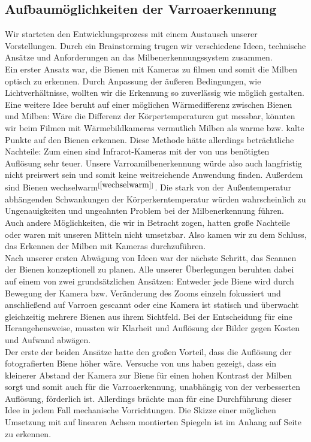 \documentclass[11pt,a4paper]{article}
\newcommand{\bibRef}[1]{\hyperlink{#1}{$^{[\ref*{#1}{}]}$}}
\begin{document}

\subsection{Aufbaumöglichkeiten der Varroaerkennung}
Wir starteten den Entwicklungsprozess mit einem Austausch unserer Vorstellungen. Durch ein Brainstorming trugen wir verschiedene Ideen, technische Ansätze und Anforderungen an das Milbenerkennungssystem zusammen. \\
Ein erster Ansatz war, die Bienen mit Kameras zu filmen und somit die Milben optisch zu erkennen. Durch Anpassung der äußeren Bedingungen, wie Lichtverhältnisse, wollten wir die Erkennung so zuverlässig wie möglich gestalten.\\
Eine weitere Idee beruht auf einer möglichen Wärmedifferenz zwischen Bienen und Milben: Wäre die Differenz der Körpertemperaturen gut messbar, könnten wir beim Filmen mit Wärmebildkameras vermutlich Milben als warme bzw. kalte Punkte auf den Bienen erkennen. Diese Methode hätte allerdings beträchtliche Nachteile: Zum einen sind Infrarot-Kameras mit der von uns benötigten Auflösung sehr teuer. Unsere Varroamilbenerkennung würde also auch langfristig nicht preiswert sein und somit keine weitreichende Anwendung finden. Außerdem sind Bienen wechselwarm\bibRef{wechselwarm}. Die stark von der Außentemperatur abhängenden Schwankungen der Körperkerntemperatur würden wahrscheinlich zu Ungenauigkeiten und ungeahnten Problem bei der Milbenerkennung führen.\\
Auch andere Möglichkeiten, die wir in Betracht zogen, hatten große Nachteile oder waren mit unseren Mitteln nicht umsetzbar. Also kamen wir zu dem Schluss, das Erkennen der Milben mit Kameras durchzuführen.\\
Nach unserer ersten Abwägung von Ideen war der nächste Schritt, das Scannen der Bienen konzeptionell zu planen. Alle unserer Überlegungen beruhten dabei auf einem von zwei grundsätzlichen Ansätzen: Entweder jede Biene wird durch Bewegung der Kamera bzw. Veränderung des Zooms einzeln fokussiert und anschließend auf Varroen gescannt oder eine Kamera ist statisch und überwacht gleichzeitig mehrere Bienen aus ihrem Sichtfeld. Bei der Entscheidung für eine Herangehensweise, mussten wir Klarheit und Auflösung der Bilder gegen Kosten und Aufwand abwägen.\\
Der erste der beiden Ansätze hatte den großen Vorteil, dass die Auflösung der fotografierten Biene höher wäre. Versuche von uns haben gezeigt, dass ein kleinerer Abstand der Kamera zur Biene für einen hohen Kontrast der Milben sorgt und somit auch für die Varroaerkennung, unabhängig von der verbesserten Auflösung, förderlich ist. Allerdings brächte man für eine Durchführung dieser Idee in jedem Fall mechanische Vorrichtungen. Die Skizze einer möglichen Umsetzung mit auf linearen Achsen montierten Spiegeln ist im Anhang auf Seite \pageref*{fig:technical-sketch} \, zu erkennen.\\
\end{document}

